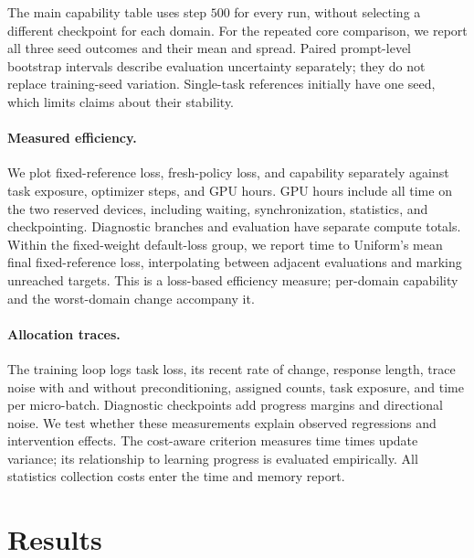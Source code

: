 The main capability table uses step $500$ for every run, without selecting a
different checkpoint for each domain. For the repeated core comparison,
we report all three seed outcomes and their mean and spread. Paired
prompt-level bootstrap intervals describe evaluation uncertainty separately;
they do not replace training-seed variation. Single-task references initially
have one seed, which limits claims about their stability.

\paragraph{Measured efficiency.}
We plot fixed-reference loss, fresh-policy loss, and capability separately
against task exposure, optimizer steps, and GPU hours. GPU hours include all
time on the two reserved devices, including waiting, synchronization,
statistics, and checkpointing. Diagnostic branches and evaluation have
separate compute totals. Within the fixed-weight default-loss group, we
report time to Uniform's mean final fixed-reference loss, interpolating
between adjacent evaluations and marking unreached targets. This is a
loss-based efficiency measure; per-domain capability and the worst-domain
change accompany it.

\paragraph{Allocation traces.}
The training loop logs task loss, its recent rate of change, response length,
trace noise with and without preconditioning, assigned counts, task exposure,
and time per micro-batch. Diagnostic checkpoints add progress margins and
directional noise. We test whether these measurements explain observed
regressions and intervention effects. The cost-aware criterion measures time
times update variance; its relationship to learning progress is evaluated
empirically. All statistics collection costs enter the time and memory report.

\section{Results}
\label{sec:results}

